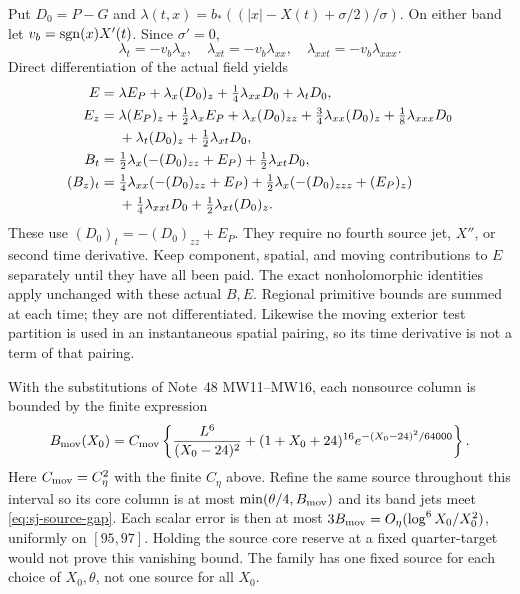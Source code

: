 Put $D_0=P-G$ and
$\lambda(t,x)=b_*((|x|-X(t)+\sigma/2)/\sigma)$.
On either band let $v_b=\operatorname{sgn}(x)X'(t)$. Since $\sigma'=0$,
\begin{equation}
 \lambda_t=-v_b\lambda_x,\quad
 \lambda_{xt}=-v_b\lambda_{xx},\quad
 \lambda_{xxt}=-v_b\lambda_{xxx}.
 \label{eq:ua-cutoff-time}
\end{equation}
Direct differentiation of the actual field yields
\begin{align}
 E={}&\lambda E_P+\lambda_x(D_0)_z+\tfrac14\lambda_{xx}D_0
                                  +\lambda_tD_0,\notag\\
 E_z={}&\lambda(E_P)_z+\tfrac12\lambda_xE_P
       +\lambda_x(D_0)_{zz}+\tfrac34\lambda_{xx}(D_0)_z
       +\tfrac18\lambda_{xxx}D_0\notag\\
      &+\lambda_t(D_0)_z+\tfrac12\lambda_{xt}D_0,\notag\\
 B_t={}&\tfrac12\lambda_x(-(D_0)_{zz}+E_P)
                              +\tfrac12\lambda_{xt}D_0,\notag\\
 (B_z)_t={}&\tfrac14\lambda_{xx}(-(D_0)_{zz}+E_P)
       +\tfrac12\lambda_x(-(D_0)_{zzz}+(E_P)_z)\notag\\
       &+\tfrac14\lambda_{xxt}D_0+\tfrac12\lambda_{xt}(D_0)_z.
 \label{eq:ua-moving-defects}
\end{align}
These use $(D_0)_t=-(D_0)_{zz}+E_P$. They require no fourth source
jet, $X''$, or second time derivative. Keep component, spatial, and
moving contributions to $E$ separately until they have all been paid.
The exact nonholomorphic identities apply unchanged with these actual
$B,E$. Regional primitive bounds are summed at each time; they are not
differentiated. Likewise the moving exterior test partition is used in
an instantaneous spatial pairing, so its time derivative is not a term
of that pairing.

With the substitutions of Note~48 MW11--MW16, each nonsource column is
bounded by the finite expression
\begin{equation}
 B_{\rm mov}(X_0)=C_{\rm mov}
 \left\{\frac{L^6}{(X_0-24)^2}
 +(1+X_0+24)^{16}e^{-(X_0-24)^2/64000}\right\}.
 \label{eq:ua-moving-budget}
\end{equation}
Here $C_{\rm mov}=C_\eta^2$ with the finite $C_\eta$ above. Refine
the same source throughout this interval so its core column is at most
$\min(\theta/4,B_{\rm mov})$ and its band jets meet
\eqref{eq:sj-source-gap}. Each scalar error is then at most
$3B_{\rm mov}=O_\eta(\log^6X_0/X_0^2)$, uniformly on $[95,97]$.
Holding the source core reserve at a fixed quarter-target would not
prove this vanishing bound. The family has one fixed source for each
choice of $X_0,\theta$, not one source for all $X_0$.


